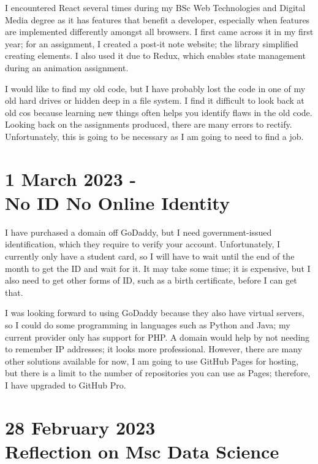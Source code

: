 \documentclass{article}
\begin{document}
I encountered React several times during my BSc Web Technologies and Digital Media degree as it has features that benefit a developer, especially when features are implemented differently amongst all browsers. I first came across it in my first year; for an assignment, I created a post-it note website; the library simplified creating elements. I also used it due to Redux, which enables state management during an animation assignment.  

I would like to find my old code, but I have probably lost the code in one of my old hard drives or hidden deep in a file system. I find it difficult to look back at old cos because learning new things often helps you identify flaws in the old code. Looking back on the assignments produced, there are many errors to rectify. Unfortunately, this is going to be necessary as I am going to need to find a job.

 \newpage


\section*{1 March 2023 - \\No ID No Online Identity}

I have purchased a domain off GoDaddy, but I need government-issued identification, which they require to verify your account. Unfortunately, I currently only have a student card, so I will have to wait until the end of the month to get the ID and wait for it. It may take some time; it is expensive, but I also need to get other forms of ID, such as a birth certificate, before I can get that. 

I was looking forward to using GoDaddy because they also have virtual servers, so I could do some programming in languages such as Python and Java; my current provider only has support for PHP. A domain would help by not needing to remember IP addresses; it looks more professional. However, there are many other solutions available for now, I am going to use GitHub Pages for hosting, but there is a limit to the number of repositories you can use as Pages; therefore, I have upgraded to GitHub Pro.

\newpage
\section*{28 February 2023 \\ Reflection on Msc Data Science}
\end{document}
